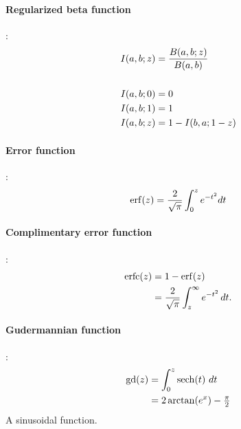 \paragraph*{Regularized beta function}\hspace{-0.8em}\cite{Abramowitz1965}:%
\label{RegBeta}
\begin{align*}
I(a,b;z) & = \frac{B(a,b;z)}{B(a,b)}				
\\
\\ I(a,b;0) & = 0 							
\\ I(a,b;1) & = 1 							
\\ I(a,b;z) & = 1 - I(b,a;1-z)					
\end{align*}





\paragraph*{Error function}\hspace{-0.8em}\cite{Abramowitz1965}:
\begin{align*}
\operatorname{erf}(z) = \frac{2}{\sqrt{\pi}}\int_0^z e^{-t^2} dt		
\end{align*}


\paragraph*{Complimentary error function}\hspace{-0.8em}\cite{Abramowitz1965}:
\begin{align*}
             \operatorname{erfc}(z) & = 1-\operatorname{erf}(z) 		 \\
                                    & = \frac{2}{\sqrt{\pi}} \int_z^{\infty} e^{-t^2}\,dt. 
\end{align*}


\paragraph*{Gudermannian function}\hspace{-0.8em}\cite{Abramowitz1965}:
\begin{align*}
\operatorname{gd}(z) & = \int_0^{z} \operatorname{sech}(t)\  dt 				 \\			
& = 2 \arctan(e^x) - \tfrac{\pi}{2}					
\end{align*}
A sinusoidal function. 

